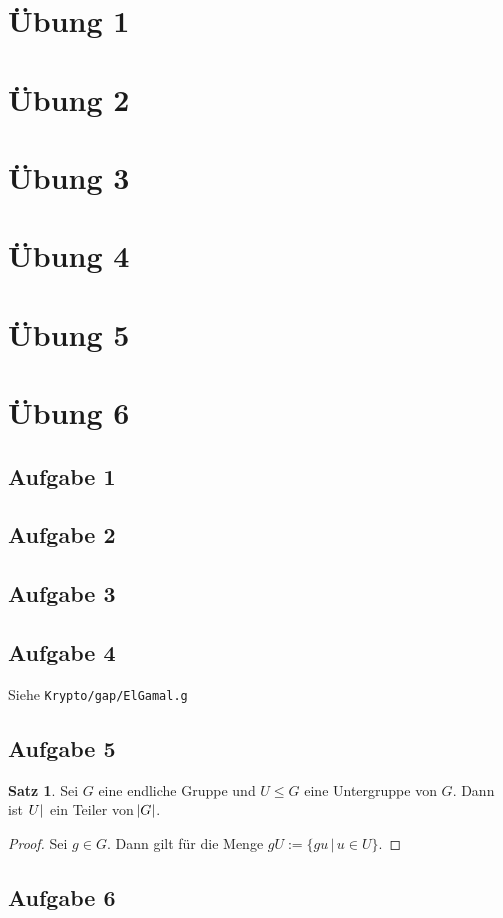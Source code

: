 \documentclass[a4paper,12pt,twoside]{article}
\theoremstyle{definition}
\newtheorem{satz}{Satz}[subsection]
\begin{document}
\section{Übung 1}
\section{Übung 2}
\section{Übung 3}
\section{Übung 4}
\section{Übung 5}
\newpage
\section{Übung 6}
\subsection{Aufgabe 1}
\subsection{Aufgabe 2}
\subsection{Aufgabe 3}
\subsection{Aufgabe 4}
Siehe \texttt{Krypto/gap/ElGamal.g}
\subsection{Aufgabe 5}

\begin{satz}
Sei $G$ eine endliche Gruppe und $U \leq G$ eine Untergruppe von $G$. Dann ist $\abs{U}$ ein Teiler von $\abs{G}$.
\end{satz}
\begin{proof}
Sei $g \in G$. Dann gilt für die Menge $gU := \{gu\,|\,u \in U \}$.
\end{proof}

\subsection{Aufgabe 6}
\end{document}
